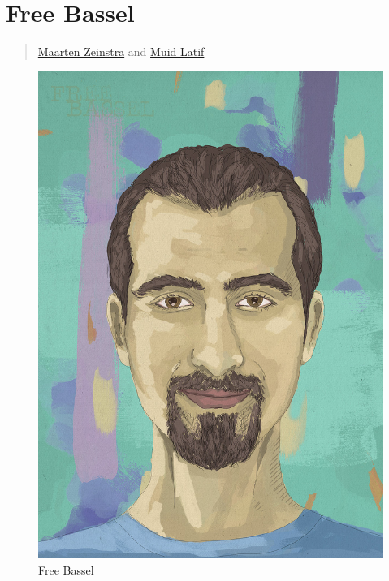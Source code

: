 \section{Free Bassel}\label{free-bassel}

\begin{quote}
\hyperlink{maarten-zeinstra}{Maarten Zeinstra}
and \hyperlink{muid-latif}{Muid Latif}
\end{quote}

\begin{figure}[htbp]
\centering
\includegraphics{../../images/ml-free-bassel-900-1.jpg}
\caption{Free Bassel}
\end{figure}
